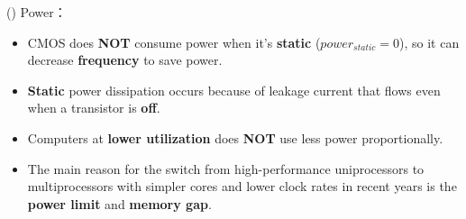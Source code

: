 \item \begin{theorem}{()} Power： \begin{itemize}
        \item CMOS does \textbf{NOT} consume power when it's \textbf{static} ($power_{static} = 0$), so it can decrease \textbf{frequency} to save power.
        \item \textbf{Static} power dissipation occurs because of leakage current that flows even when a transistor is \textbf{off}.
        \item Computers at \textbf{lower utilization} does \textbf{NOT} use less power proportionally.
        \item The main reason for the switch from high-performance uniprocessors to multiprocessors with simpler cores and lower clock rates in recent years is the \textbf{power limit} and \textbf{memory gap}.
    \end{itemize}
\end{theorem}


